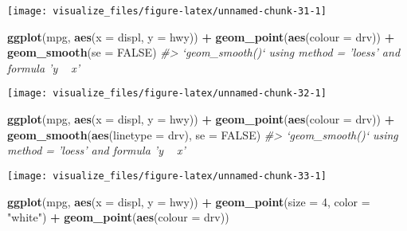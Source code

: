 \documentclass[]{book}
\newenvironment{Shaded}{\begin{snugshade}}{\end{snugshade}}
\newcommand{\CommentTok}[1]{\textcolor[rgb]{0.56,0.35,0.01}{\textit{#1}}}
\newcommand{\DataTypeTok}[1]{\textcolor[rgb]{0.13,0.29,0.53}{#1}}
\newcommand{\DecValTok}[1]{\textcolor[rgb]{0.00,0.00,0.81}{#1}}
\newcommand{\KeywordTok}[1]{\textcolor[rgb]{0.13,0.29,0.53}{\textbf{#1}}}
\newcommand{\NormalTok}[1]{#1}
\newcommand{\OperatorTok}[1]{\textcolor[rgb]{0.81,0.36,0.00}{\textbf{#1}}}
\newcommand{\OtherTok}[1]{\textcolor[rgb]{0.56,0.35,0.01}{#1}}
\newcommand{\StringTok}[1]{\textcolor[rgb]{0.31,0.60,0.02}{#1}}
\theoremstyle{plain}
\theoremstyle{remark}
\begin{document}
\begin{center}\texttt{[image: visualize\_files/figure-latex/unnamed-chunk-31-1]} \end{center}

\begin{Shaded}
\begin{Highlighting}[]
\KeywordTok{ggplot}\NormalTok{(mpg, }\KeywordTok{aes}\NormalTok{(}\DataTypeTok{x =}\NormalTok{ displ, }\DataTypeTok{y =}\NormalTok{ hwy)) }\OperatorTok{+}
\StringTok{  }\KeywordTok{geom_point}\NormalTok{(}\KeywordTok{aes}\NormalTok{(}\DataTypeTok{colour =}\NormalTok{ drv)) }\OperatorTok{+}
\StringTok{  }\KeywordTok{geom_smooth}\NormalTok{(}\DataTypeTok{se =} \OtherTok{FALSE}\NormalTok{)}
\CommentTok{#> `geom_smooth()` using method = 'loess' and formula 'y ~ x'}
\end{Highlighting}
\end{Shaded}

\begin{center}\texttt{[image: visualize\_files/figure-latex/unnamed-chunk-32-1]} \end{center}

\begin{Shaded}
\begin{Highlighting}[]
\KeywordTok{ggplot}\NormalTok{(mpg, }\KeywordTok{aes}\NormalTok{(}\DataTypeTok{x =}\NormalTok{ displ, }\DataTypeTok{y =}\NormalTok{ hwy)) }\OperatorTok{+}
\StringTok{  }\KeywordTok{geom_point}\NormalTok{(}\KeywordTok{aes}\NormalTok{(}\DataTypeTok{colour =}\NormalTok{ drv)) }\OperatorTok{+}
\StringTok{  }\KeywordTok{geom_smooth}\NormalTok{(}\KeywordTok{aes}\NormalTok{(}\DataTypeTok{linetype =}\NormalTok{ drv), }\DataTypeTok{se =} \OtherTok{FALSE}\NormalTok{)}
\CommentTok{#> `geom_smooth()` using method = 'loess' and formula 'y ~ x'}
\end{Highlighting}
\end{Shaded}

\begin{center}\texttt{[image: visualize\_files/figure-latex/unnamed-chunk-33-1]} \end{center}

\begin{Shaded}
\begin{Highlighting}[]
\KeywordTok{ggplot}\NormalTok{(mpg, }\KeywordTok{aes}\NormalTok{(}\DataTypeTok{x =}\NormalTok{ displ, }\DataTypeTok{y =}\NormalTok{ hwy)) }\OperatorTok{+}
\StringTok{   }\KeywordTok{geom_point}\NormalTok{(}\DataTypeTok{size =} \DecValTok{4}\NormalTok{, }\DataTypeTok{color =} \StringTok{"white"}\NormalTok{) }\OperatorTok{+}
\StringTok{   }\KeywordTok{geom_point}\NormalTok{(}\KeywordTok{aes}\NormalTok{(}\DataTypeTok{colour =}\NormalTok{ drv))}
\end{Highlighting}
\end{Shaded}
\end{document}
